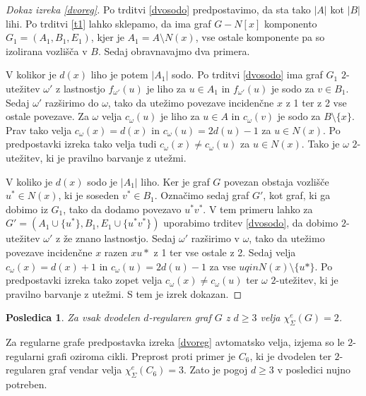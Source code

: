 \documentclass[12pt,a4paper,twoside]{article}
\theoremstyle{definition} %
\theoremstyle{plain} %
\newtheorem{posledica}[definicija]{Posledica}
\newcommand{\ec}{\chi_{\Sigma}^e}
\numberwithin{equation}{section}  %
\begin{document}
\begin{proof}[Dokaz izreka \ref{dvoreg}]
Po trditvi \ref{dvosodo} predpostavimo, da sta tako $|A|$ kot $|B|$ lihi.
Po trditvi \ref{t1} lahko sklepamo, da ima graf $G - N[x]$ komponento $G_1 = (A_1, B_1, E_1)$, kjer je $A_1 = A \setminus N(x)$, vse ostale komponente pa so izolirana vozlišča v $B$. Sedaj obravnavajmo dva primera.

V kolikor je $d(x)$ liho je potem $|A_1|$ sodo. Po trditvi \ref{dvosodo} ima graf $G_1$ $2$-utežitev $\omega'$ z lastnostjo $f_{\omega'}(u)$ je liho za $u \in A_1$ in  $f_{\omega'}(u)$ je sodo za $v \in B_1$. Sedaj $\omega'$ razširimo do $\omega$, tako da utežimo povezave incidenčne $x$ z 1 ter z 2 vse ostale povezave. Za $\omega$ velja $c_{\omega}(u)$ je liho za $u \in A$  in $c_{\omega}(v)$ je sodo za $B \setminus \{x\}$. Prav tako velja $c_{\omega}(x) = d(x)$ in $c_{\omega}(u) = 2d(u) - 1$ za $u \in N(x)$. Po predpostavki izreka tako velja tudi $c_{\omega}(x) \neq c_{\omega}(u)$ za $u \in N(x)$. Tako je $\omega$ $2$-utežitev, ki je pravilno barvanje z utežmi.

V koliko je $d(x)$ sodo je $|A_1|$ liho. Ker je graf $G$ povezan obstaja vozlišče $u^* \in N(x)$, ki je soseden $v^* \in B_1$. Označimo sedaj graf $G'$, kot graf, ki ga dobimo iz $G_1$, tako da dodamo povezavo $u^*v^*$. V tem primeru lahko za $G' = (A_1 \cup \{u^*\}, B_1, E_1 \cup \{u^*v^*\})$ uporabimo trditev \ref{dvosodo}, da dobimo $2$-utežitev $\omega'$ z že znano lastnostjo. Sedaj $\omega'$ razširimo v $\omega$, tako da utežimo povezave incidenčne $x$ razen $xu*$ z 1 ter vse ostale z 2. Sedaj velja $c_{\omega}(x) = d(x) + 1$ in $c_{\omega}(u) = 2d(u) - 1$ za vse $u qin N(x) \setminus \{u*\}$. Po predpostavki izreka tako zopet velja $c_{\omega}(x) \neq c_{\omega}(u)$ ter $\omega$ $2$-utežitev, ki je pravilno barvanje z utežmi. S tem je izrek dokazan.
\end{proof}
\begin{posledica}

Za vsak dvodelen $d$-regularen graf $G$ z $d \ge 3$ velja $\ec(G) = 2$. 
\end{posledica}

Za regularne grafe predpostavka izreka \ref{dvoreg} avtomatsko velja, izjema so le $2$-regularni grafi oziroma cikli. Preprost proti primer je $C_6$, ki je dvodelen ter $2$-regularen graf vendar velja $\ec(C_6) = 3$. Zato je pogoj $d \ge 3$ v posledici nujno potreben.
\end{document}
